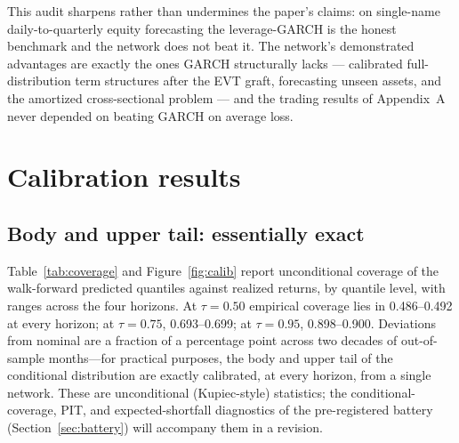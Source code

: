 \documentclass[11pt]{article}
\begin{document}
This audit sharpens rather than undermines the paper's claims: on
single-name daily-to-quarterly equity forecasting the leverage-GARCH is
the honest benchmark and the network does not beat it. The network's
demonstrated advantages are exactly the ones GARCH structurally lacks
--- calibrated full-distribution term structures after the EVT graft,
forecasting unseen assets, and the amortized cross-sectional problem ---
and the trading results of Appendix~A never depended on beating GARCH on
average loss.

\section{Calibration results}\label{sec:calibration}

\subsection{Body and upper tail: essentially exact}\label{sec:body}
Table~\ref{tab:coverage} and Figure~\ref{fig:calib} report unconditional coverage of the walk-forward predicted quantiles against realized returns, by quantile level, with ranges across the four horizons. At $\tau=0.50$ empirical coverage lies in 0.486--0.492 at every horizon; at $\tau=0.75$, 0.693--0.699; at $\tau=0.95$, 0.898--0.900. Deviations from nominal are a fraction of a percentage point across two decades of out-of-sample months---for practical purposes, the body and upper tail of the conditional distribution are exactly calibrated, at every horizon, from a single network. These are unconditional (Kupiec-style) statistics; the conditional-coverage, PIT, and expected-shortfall diagnostics of the pre-registered battery (Section~\ref{sec:battery}) will accompany them in a revision.
\end{document}
